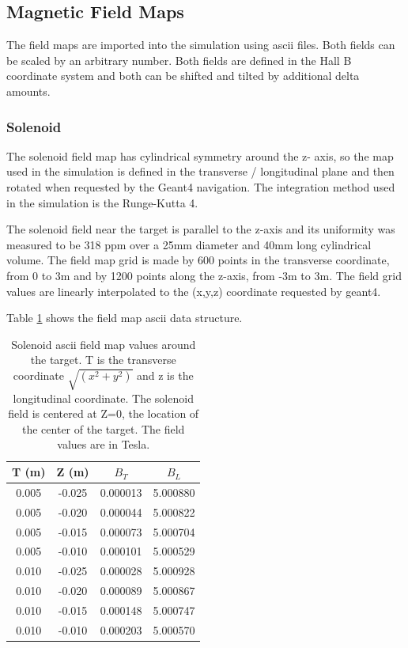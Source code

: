\subsection{Magnetic Field Maps} \label{clas12FieldMaps}


The field maps are imported into the simulation using ascii files. Both fields can be scaled by an arbitrary number.
Both fields are defined in the Hall B coordinate system and both can be shifted and tilted by additional delta amounts.

\subsubsection{Solenoid}
The solenoid field map has cylindrical symmetry around the z- axis, so the map used in the simulation is defined in the transverse / longitudinal plane
and then rotated when requested by the Geant4 navigation. The integration method used in the simulation is the Runge-Kutta 4.

The solenoid field near the target is parallel to the z-axis and its uniformity was measured to be 318 ppm over a 25mm diameter and 40mm long cylindrical volume.
The field map grid is made by 600 points in the transverse coordinate, from 0 to 3m and by 1200 points
along the z-axis, from \mbox{-3m} to 3m.
The field grid values are linearly interpolated to the (x,y,z) coordinate requested by geant4.

Table \ref{tab:solMap} shows the field map ascii data structure.


\begin{table}[h]
	\begin{center}
		\begin{tabular}{| c | c | c | c |}
			T (m)  & Z (m) &  $B_T $  & $ B_L $ \\
			\hline
          0.005  &  -0.025 & 0.000013  & 5.000880 \\
          0.005  &  -0.020 & 0.000044  & 5.000822 \\
          0.005  &  -0.015 & 0.000073  & 5.000704 \\
          0.005  &  -0.010 & 0.000101  & 5.000529 \\
          0.010  &  -0.025 & 0.000028  & 5.000928 \\
          0.010  &  -0.020 & 0.000089  & 5.000867 \\
          0.010  &  -0.015 & 0.000148  & 5.000747 \\
          0.010  &  -0.010 & 0.000203  & 5.000570 \\
		\end{tabular}
	\end{center}
\caption{Solenoid ascii field map values around the target. T is the transverse coordinate $\sqrt{(x^2+y^2)}$ and z is the longitudinal coordinate.
            The solenoid field is centered at Z=0, the location of the center of the target. The field values are in Tesla.}\label{tab:solMap}
\end{table}


